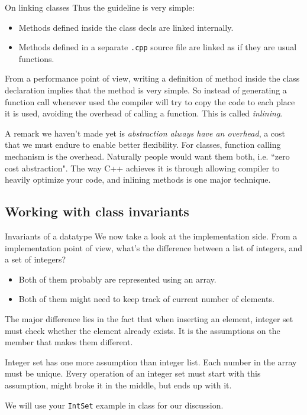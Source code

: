 \begin{frame}{On linking classes}
Thus the guideline is very simple:
\begin{itemize}
\item Methods defined inside the class decls are linked internally.
\item Methods defined in a separate \texttt{.cpp} source file are linked as if they are usual functions.
\end{itemize}
From a performance point of view, writing a definition of method inside the class declaration implies that the method is very simple. So instead of generating a function call whenever used the compiler will try to copy the code to each place it is used, avoiding the overhead of calling a function. This is called \textit{inlining}. 

\vspace{0.05in}
A remark we haven't made yet is \textit{abstraction always have an overhead}, a cost that we must endure to enable better flexibility. For classes, function calling mechanism is the overhead. Naturally people would want them both, i.e. ``zero cost abstraction". The way C++ achieves it is through allowing compiler to heavily optimize your code, and inlining methods is one major technique.
\end{frame}

\subsection{Working with class invariants}	
\begin{frame}{Invariants of a datatype}
We now take a look at the implementation side. From a implementation point of view, what's the difference between a list of integers, and a set of integers? 
\begin{itemize}
	\item Both of them probably are represented using an array.
	\item Both of them might need to keep track of current number of elements. 
\end{itemize} 
The major difference lies in the fact that when inserting an element, integer set must check whether the element already exists. It is the assumptions on the member that makes them different.

\vspace{0.05in}
Integer set has one more assumption than integer list. Each number in the array must be unique. Every operation of an integer set must start with this assumption, might broke it in the middle, but ends up with it.

\vspace{0.05in}
We will use your \texttt{IntSet} example in class for our discussion.
\end{frame}

